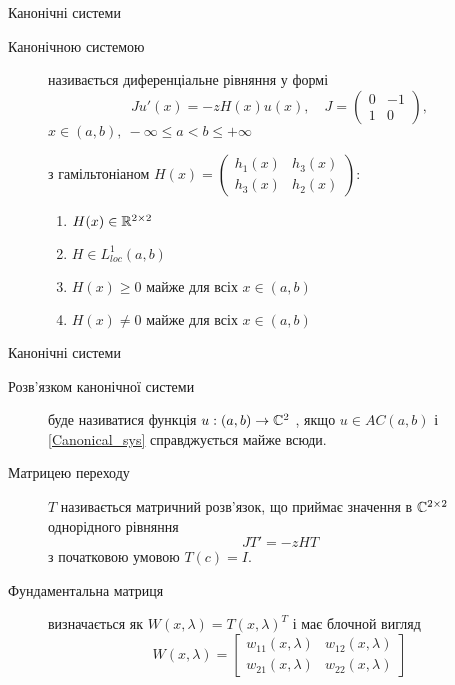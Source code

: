 

\begin{frame}{Канонічні системи}
	\begin{description}
		\item [Канонічною системою] називається диференціальне рівняння у формі
		\begin{equation} \label{Canonical_sys}\tag{CS}
			Ju'(x) = -zH(x)u(x), \quad 
			J=
			\begin{pmatrix}
				0 & -1\\
				1 & 0
			\end{pmatrix},
		\end{equation}
		$x\in (a,b),\  -\infty\le a<b \le +\infty$
		
		з гамільтоніаном $H(x) = \begin{pmatrix}
				h_1(x) & h_3(x)\\
				h_3(x) & h_2(x)
			\end{pmatrix}$:
		\begin{enumerate}
			\item $H(x) \in \mathbb{R}^{2\times 2}$
			\item $H \in L^1_{loc}(a,b)$
			\item $H(x)\ge 0 \text{ майже для всіх } x\in(a,b)$
			\item $H(x)\ne 0 \text{ майже для всіх } x\in(a,b)$
		\end{enumerate}
	\end{description}
\end{frame}

\begin{frame}{Канонічні системи}
		\begin{description}
			\item [Розв'язком канонічної системи] буде називатися функція $u:(a,b)\to\mathbb{C}^2$ , якщо $u\in AC(a,b)$ і \eqref{Canonical_sys} справджується майже всюди.
			\item [Матрицею переходу] $T$ називається матричний розв'язок, що приймає значення в $\mathbb{C}^{2\times 2}$ однорідного рівняння
			\begin{equation}\label{eq-Canonycal_sys_matrix}
				JT'=-zHT
			\end{equation}
			з початковою умовою $T(c) = I$.
			\item [Фундаментальна матриця] визначається як $W(x,\lambda) = T(x,\lambda)^{T}$ і має блочной вигляд
			\begin{equation} \tag{FM}
			 	W(x,\lambda)= 
			 	\begin{bmatrix}
			 		w_{11}(x,\lambda) & w_{12}(x,\lambda)\\
			 		w_{21}(x,\lambda) & w_{22}(x,\lambda)
			 	\end{bmatrix}
			 \end{equation}
		\end{description}
\end{frame}

